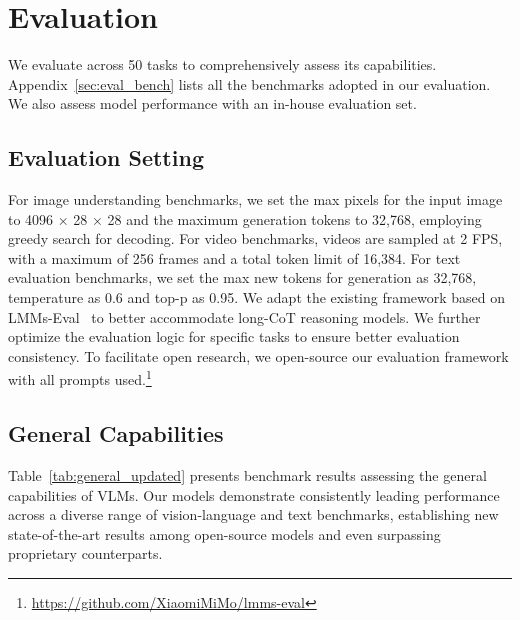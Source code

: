 \section{Evaluation}
We evaluate \mimovl{} across 50 tasks to comprehensively assess its capabilities. Appendix~\ref{sec:eval_bench} lists all the benchmarks adopted in our evaluation. 
We also assess model performance with an in-house evaluation set. 








\subsection{Evaluation Setting}


For image understanding benchmarks, we set the max pixels for the input image to 4096 × 28 × 28 and the maximum generation tokens to 32,768, employing greedy search for decoding. 
For video benchmarks, videos are sampled at 2 FPS, with a maximum of 256 frames and a total token limit of 16,384.
For text evaluation benchmarks, we set the max new tokens for generation as 32,768, temperature as 0.6 and top-p as 0.95.
We adapt the existing framework based on LMMs-Eval~\citep{lmmseval} to better accommodate long-CoT reasoning models. 
We further optimize the evaluation logic for specific tasks to ensure better evaluation consistency. 
To facilitate open research, we open-source our evaluation framework with all prompts used.\footnote{\url{https://github.com/XiaomiMiMo/lmms-eval}}


\subsection{General Capabilities}


Table~\ref{tab:general_updated} presents benchmark results assessing the general capabilities of VLMs. Our \mimovl{} models demonstrate consistently leading performance across a diverse range of vision-language and text benchmarks, establishing new state-of-the-art results among open-source models and even surpassing proprietary counterparts.

